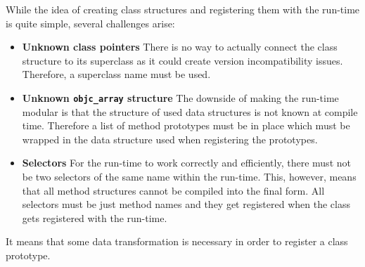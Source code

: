 While the idea of creating class structures and registering them with the run-time is quite simple, several challenges arise:

\begin{itemize}
  \item{\bf{Unknown class pointers}} There is no way to actually connect the class structure to its superclass as it could create version incompatibility issues. Therefore, a superclass name must be used.
  \item{\bf{Unknown \verb=objc_array= structure}} The downside of making the run-time modular is that the structure of used data structures is not known at compile time. Therefore a list of method prototypes must be in place which must be wrapped in the data structure used when registering the prototypes.
  \item{\bf{Selectors}} For the run-time to work correctly and efficiently, there must not be two selectors of the same name within the run-time. This, however, means that all method structures cannot be compiled into the final form. All selectors must be just method names and they get registered when the class gets registered with the run-time.
\end{itemize}

It means that some data transformation is necessary in order to register a class prototype.

